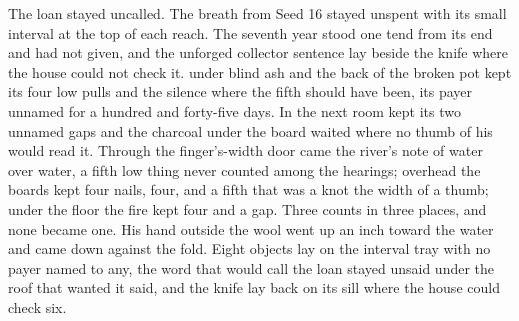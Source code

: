 The loan stayed uncalled. The breath from Seed 16 stayed unspent with its small interval at the top of each reach. The seventh year stood one tend from its end and had not given, and the unforged collector sentence lay beside the knife where the house could not check it.  under blind ash and the back of the broken pot kept its four low pulls and the silence where the fifth should have been, its payer unnamed for a hundred and forty-five days. In the next room  kept its two unnamed gaps and the charcoal under the board waited where no thumb of his would read it. Through the finger's-width door came the river's note of water over water, a fifth low thing never counted among the hearings; overhead the boards kept four nails, four, and a fifth that was a knot the width of a thumb; under the floor the fire kept four and a gap. Three counts in three places, and none became one. His hand outside the wool went up an inch toward the water and came down against the fold. Eight objects lay on the interval tray with no payer named to any, the word that would call the loan stayed unsaid under the roof that wanted it said, and the knife lay back on its sill where the house could check six.
